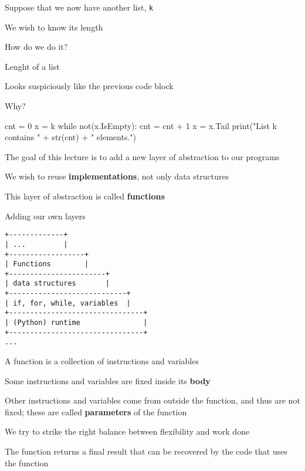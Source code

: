 \documentclass{beamer}
\begin{document}
\begin{slide}{
\item Suppose that we now have another list, \texttt{k}
\item We wish to know its length
\item How do we do it?
}\end{slide}

\begin{frame}[fragile]{Lenght of a list}
\begin{codewithblock}{\pause \item Looks suspiciously like the previous code block \item Why?}
cnt = 0
x = k
while not(x.IsEmpty):
  cnt = cnt + 1
  x = x.Tail
print("List k contains " + str(cnt) + " elements.")
\end{codewithblock}
\end{frame}

\begin{slide}{
\item The goal of this lecture is to add a new layer of abstraction to our programs
\item We wish to reuse \textbf{implementations}, not only data structures
\item This layer of abstraction is called \textbf{functions}
}\end{slide}

\begin{frame}[fragile]{Adding our own layers}
\begin{lstlisting}
+-------------+
| ...         |
+------------------+
| Functions        |
+-----------------------+
| data structures       |
+----------------------------+
| if, for, while, variables  |
+--------------------------------+
| (Python) runtime               |
+--------------------------------+
...
\end{lstlisting}
\end{frame}

\begin{slide}{
\item A function is a collection of instructions and variables
\item Some instructions and variables are fixed inside its \textbf{body}
\item Other instructions and variables come from outside the function, and thus are not fixed; these are called \textbf{parameters} of the function
\item We try to strike the right balance between flexibility and work done
\item The function returns a final result that can be recovered by the code that uses the function
}\end{slide}
\end{document}
